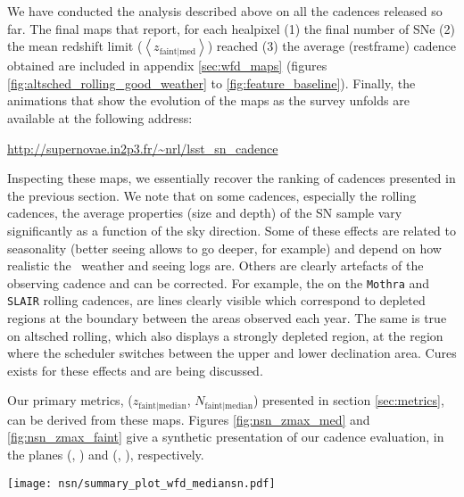 We have conducted the analysis described above on all the cadences released
so far.  The final maps that report, for each healpixel (1) the final
number of SNe (2) the mean redshift limit
($\left<z_{\mathrm{faint|med}}\right>$) reached (3) the average
(restframe) cadence obtained are included in appendix
\ref{sec:wfd_maps} (figures \ref{fig:altsched_rolling_good_weather} to
\ref{fig:feature_baseline}). Finally, the animations that show the evolution
of the maps as the survey unfolds are available at the following address:
\begin{center}
  \href{http://supernovae.in2p3.fr/~nrl/lsst_sn_cadence}{http://supernovae.in2p3.fr/\~{}nrl/lsst\_sn\_cadence}
\end{center}
Inspecting these maps, we essentially recover the ranking of cadences
presented in the previous section.  We note that on some cadences,
especially the rolling cadences, the average properties (size and
depth) of the SN sample vary significantly as a function of the sky
direction. Some of these effects are related to seasonality (better
seeing allows to go deeper, for example) and depend on how realistic
the \opsim~weather and seeing logs are. Others are clearly artefacts
of the observing cadence and can be corrected. For example, the on the
{\tt Mothra} and {\tt SLAIR} rolling cadences, are lines clearly
visible which correspond to depleted regions at the boundary between
the areas observed each year. The same is true on altsched rolling,
which also displays a strongly depleted region, at the region where
the scheduler switches between the upper and lower declination area.
Cures exists for these effects and are being discussed. 

Our primary metrics, ($z_{\mathrm{faint|median}}$, $N_{\mathrm{faint|median}}$) 
presented in section \ref{sec:metrics}, can be derived from these
maps.  Figures \ref{fig:nsn_zmax_med} and \ref{fig:nsn_zmax_faint}
give a synthetic presentation of our cadence evaluation, in the planes
(\zfaint, \nsnfaint) and (\zmed, \nsnmed), respectively.

\begin{sidewaysfigure}
  \begin{center}
    \texttt{[image: nsn/summary\_plot\_wfd\_mediansn.pdf]}
    \caption{Representation of the cadences analyzed in this study in
      the plane (\zmed, \nsnmed). This gives an assessement, for each
      cadence, of (1) the sample depth, i.e. at which redshift the
      median SN no longer passes the requirements listed in section
      \ref{sec:sn_sampling_requirements} and (2) the size of the
      subset of well-sampled SNe~Ia.}
    \label{fig:nsn_zmax_med}
  \end{center}
\end{sidewaysfigure}


